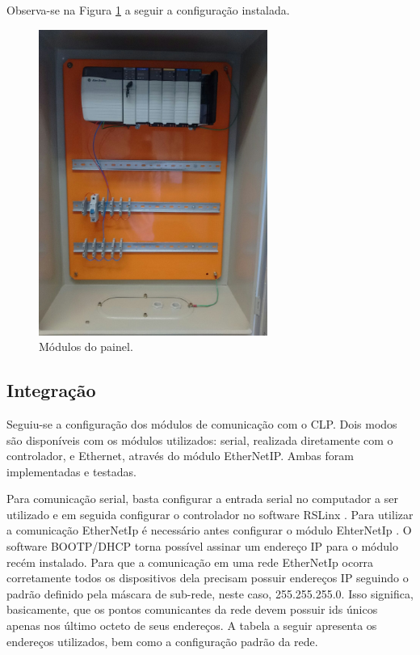 Observa-se na Figura \ref{fig:modulos} a seguir a configuração instalada.

\begin{figure}[H]
	\centering
	\includegraphics[height=10cm,keepaspectratio]{figs/modulos.jpg}
	\caption{Módulos do painel.}
	\label{fig:modulos}
\end{figure}

\subsection{Integração}
Seguiu-se a configuração dos módulos de comunicação com o CLP. Dois modos são disponíveis com os módulos utilizados: serial, realizada diretamente com o controlador, e Ethernet, através do módulo EtherNetIP. Ambas foram implementadas e testadas.

Para comunicação serial, basta configurar a entrada serial no computador a ser utilizado e em seguida configurar o controlador no software RSLinx \cite{rslinx}. Para utilizar a comunicação EtherNetIp é necessário antes configurar o módulo EhterNetIp \cite{ethernetmodule}. O software BOOTP/DHCP torna possível assinar um endereço IP para o módulo recém instalado. Para que a comunicação em uma rede EtherNetIp ocorra corretamente todos os dispositivos dela precisam possuir endereços IP seguindo o padrão definido pela máscara de sub-rede, neste caso, 255.255.255.0. Isso significa, basicamente, que os pontos comunicantes da rede devem possuir ids únicos apenas nos último octeto de seus endereços. A tabela a seguir apresenta os endereços utilizados, bem como a configuração padrão da rede.


